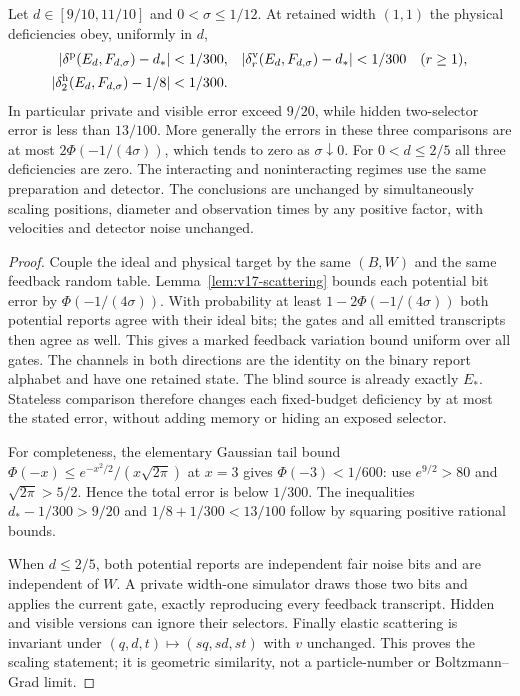 \begin{theorem}
\label{thm:v17-physicalgap}
Let $d\in[9/10,11/10]$ and $0<\sigma\le1/12$. At retained width
$(1,1)$ the physical deficiencies obey, uniformly in $d$,
\begin{align}
 |\delta^{\rm p}(E_d,F_{d,\sigma})-d_*|&<1/300,
 &|\delta^{\rm v}_r(E_d,F_{d,\sigma})-d_*|&<1/300\quad(r\ge1),
 \label{eq:v17-physicalgap}\\
 |\delta^{\rm h}_2(E_d,F_{d,\sigma})-1/8|&<1/300.&&\nonumber
\end{align}
In particular private and visible error exceed $9/20$, while hidden
two-selector error is less than $13/100$. More generally the errors
in these three comparisons are at most
$2\Phi(-1/(4\sigma))$, which tends to zero as $\sigma\downarrow0$.
For $0<d\le2/5$ all three deficiencies are zero. The interacting and
noninteracting regimes use the same preparation and detector.
The conclusions are unchanged by simultaneously scaling positions,
diameter and observation times by any positive factor, with velocities
and detector noise unchanged.
\end{theorem}
\begin{proof}
Couple the ideal and physical target by the same $(B,W)$ and the same
feedback random table. Lemma~\ref{lem:v17-scattering} bounds each
potential bit error by $\Phi(-1/(4\sigma))$. With probability at least
$1-2\Phi(-1/(4\sigma))$ both potential reports agree with their ideal
bits; the gates and all emitted transcripts then agree as well.
This gives a marked feedback variation bound uniform over all gates.
The channels in both directions are the identity on the binary report
alphabet and have one retained state. The blind source is already
exactly $E_*$. Stateless comparison therefore changes each fixed-budget
deficiency by at most the stated error, without adding memory or
hiding an exposed selector.

For completeness, the elementary Gaussian tail bound
$\Phi(-x)\le e^{-x^2/2}/(x\sqrt{2\pi})$ at $x=3$ gives
$\Phi(-3)<1/600$: use $e^{9/2}>80$ and
$\sqrt{2\pi}>5/2$. Hence the total error is below $1/300$.
The inequalities $d_*-1/300>9/20$ and
$1/8+1/300<13/100$ follow by squaring positive rational bounds.

When $d\le2/5$, both potential reports are independent fair noise
bits and are independent of $W$. A private width-one simulator draws
those two bits and applies the current gate, exactly reproducing every
feedback transcript. Hidden and visible versions can ignore their
selectors. Finally elastic scattering is invariant under
$(q,d,t)\mapsto(sq,sd,st)$ with $v$ unchanged. This proves the scaling
statement; it is geometric similarity, not a particle-number or
Boltzmann--Grad limit.
\end{proof}

